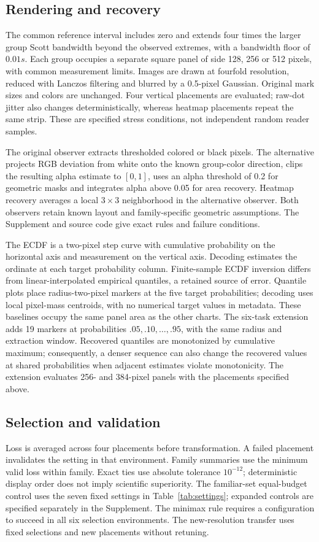 \documentclass[11pt]{article}
\begin{document}
\subsection*{Rendering and recovery}
The common reference interval includes zero and extends four times the larger group Scott bandwidth beyond the observed extremes, with a bandwidth floor of $0.01s$. Each group occupies a separate square panel of side 128, 256 or 512 pixels, with common measurement limits. Images are drawn at fourfold resolution, reduced with Lanczos filtering and blurred by a 0.5-pixel Gaussian. Original mark sizes and colors are unchanged. Four vertical placements are evaluated; raw-dot jitter also changes deterministically, whereas heatmap placements repeat the same strip. These are specified stress conditions, not independent random reader samples.

The original observer extracts thresholded colored or black pixels. The alternative projects RGB deviation from white onto the known group-color direction, clips the resulting alpha estimate to $[0,1]$, uses an alpha threshold of 0.2 for geometric masks and integrates alpha above 0.05 for area recovery. Heatmap recovery averages a local $3\times3$ neighborhood in the alternative observer. Both observers retain known layout and family-specific geometric assumptions. The Supplement and source code give exact rules and failure conditions.

The ECDF is a two-pixel step curve with cumulative probability on the horizontal axis and measurement on the vertical axis. Decoding estimates the ordinate at each target probability column. Finite-sample ECDF inversion differs from linear-interpolated empirical quantiles, a retained source of error. Quantile plots place radius-two-pixel markers at the five target probabilities; decoding uses local pixel-mass centroids, with no numerical target values in metadata. These baselines occupy the same panel area as the other charts. The six-task extension adds 19 markers at probabilities $.05,.10,\ldots,.95$, with the same radius and extraction window. Recovered quantiles are monotonized by cumulative maximum; consequently, a denser sequence can also change the recovered values at shared probabilities when adjacent estimates violate monotonicity. The extension evaluates 256- and 384-pixel panels with the placements specified above.

\subsection*{Selection and validation}
Loss is averaged across four placements before transformation. A failed placement invalidates the setting in that environment. Family summaries use the minimum valid loss within family. Exact ties use absolute tolerance $10^{-12}$; deterministic display order does not imply scientific superiority. The familiar-set equal-budget control uses the seven fixed settings in Table~\ref{tab:settings}; expanded controls are specified separately in the Supplement. The minimax rule requires a configuration to succeed in all six selection environments. The new-resolution transfer uses fixed selections and new placements without retuning.
\end{document}
